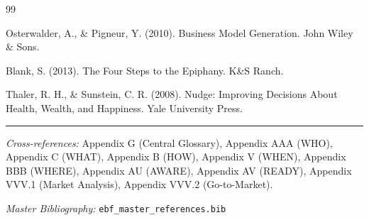 \begin{thebibliography}{99}

 Osterwalder, A., \& Pigneur, Y. (2010). Business Model Generation. John Wiley \& Sons.

 Blank, S. (2013). The Four Steps to the Epiphany. K\&S Ranch.

 Thaler, R. H., \& Sunstein, C. R. (2008). Nudge: Improving Decisions About Health, Wealth, and Happiness. Yale University Press.

\end{thebibliography}



\vspace{1em}
\hrule
\vspace{0.5em}

\noindent\textit{Cross-references:}
Appendix G (Central Glossary),
Appendix AAA (WHO),
Appendix C (WHAT),
Appendix B (HOW),
Appendix V (WHEN),
Appendix BBB (WHERE),
Appendix AU (AWARE),
Appendix AV (READY),
Appendix VVV.1 (Market Analysis),
Appendix VVV.2 (Go-to-Market).

\noindent\textit{Master Bibliography:} \texttt{ebf\_master\_references.bib}


